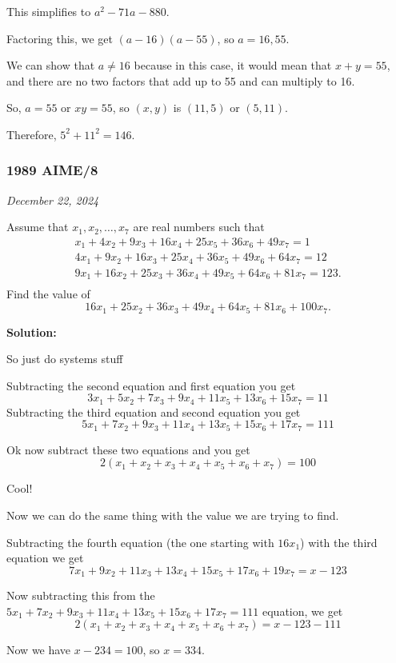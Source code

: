 \documentclass[../mathproblems.tex]{subfiles}
\begin{document}
This simplifies to $a^2-71a-880$.

Factoring this, we get $(a-16)(a-55)$, so $a=16,55$.

We can show that $a\neq 16$ because in this case, it would mean that $x+y=55$, and there are no two factors that add up to 55 and can multiply to 16.

So, $a=55$ or $xy=55$, so $(x,y)$ is $(11,5)$ or $(5,11)$.

Therefore, $5^2+11^2=\boxed{146}$.

\noindent\hrulefill

\subsubsection*{1989 AIME/8}
\textit{December 22, 2024}

Assume that $x_1,x_2,\ldots,x_7$ are real numbers such that
\[ \begin{array}{r} x_1+4x_2+9x_3+16x_4+25x_5+36x_6+49x_7=1\,\,\,\,\,\,\,\, \\ 4x_1+9x_2+16x_3+25x_4+36x_5+49x_6+64x_7=12\,\,\,\,\, \\ 9x_1+16x_2+25x_3+36x_4+49x_5+64x_6+81x_7=123. \\ \end{array} \]Find the value of \[16x_1+25x_2+36x_3+49x_4+64x_5+81x_6+100x_7.\]

\textbf{Solution:}

So just do systems stuff

Subtracting the second equation and first equation you get 
\[ 3x_1+5x_2+7x_3+9x_4+11x_5+13x_6+15x_7 = 11\]
Subtracting the third equation and second equation you get 
\[ 5x_1+7x_2+9x_3+11x_4+13x_5+15x_6+17x_7 = 111 \]

Ok now subtract these two equations and you get 
\[ 2(x_1+x_2+x_3+x_4+x_5+x_6+x_7) = 100 \]

Cool!

Now we can do the same thing with the value we are trying to find.

Subtracting the fourth equation (the one starting with $16x_1$) with the third equation we get 
\[ 7x_1+9x_2+11x_3+13x_4+15x_5+17x_6+19x_7 = x-123 \]

Now subtracting this from the $5x_1+7x_2+9x_3+11x_4+13x_5+15x_6+17x_7 = 111$ equation, we get 
\[ 2(x_1+x_2+x_3+x_4+x_5+x_6+x_7) = x-123-111\]

Now we have $x-234 = 100$, so $x=\boxed{334}$.

\noindent\hrulefill
\end{document}
